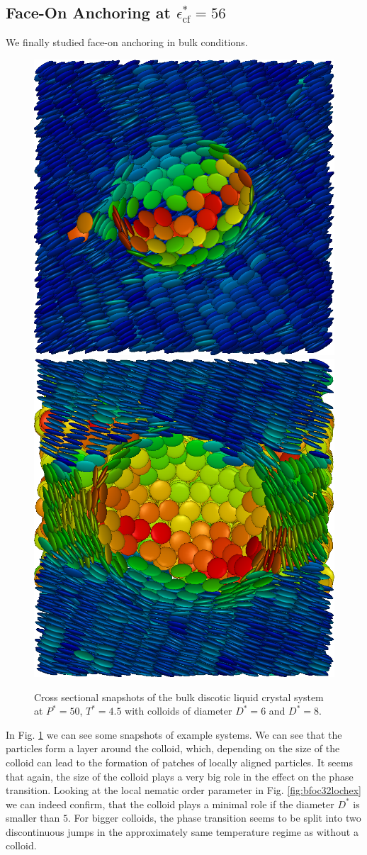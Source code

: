 \subsection{Face-On Anchoring at  $\epsilon_{\text{cf}}^*= 56$}

 We finally studied face-on anchoring in bulk conditions.
\begin{figure}[H]
 \centering
 \includegraphics[width=.4\linewidth]{images/bfo_C80_D6.png}
 \qquad
 \includegraphics[width=.4\linewidth]{images/bfo_C80_D8.png}
\caption{Cross sectional snapshots of the bulk discotic liquid crystal system at $P^* = 50$, $T^* = 4.5$ with colloids of diameter $D^* = 6$ and $D^*=8$. }
 \label{fig:bfosnapshots}
\end{figure}
In Fig. \ref{fig:bfosnapshots} we can see some snapshots of example systems. We can see that the particles form a layer around the colloid, which, depending on the size of the colloid can lead to the formation of patches of locally aligned particles. It seems that again, the size of the colloid plays a very big role in the effect on the phase transition.
Looking at the local nematic order parameter in Fig. \ref{fig:bfoc32lochex} we can indeed confirm, that the colloid plays a minimal role if the diameter $D^*$ is smaller than $5$. For bigger colloids, the phase transition seems to be split into two discontinuous jumps in the approximately same temperature regime as without a colloid.

